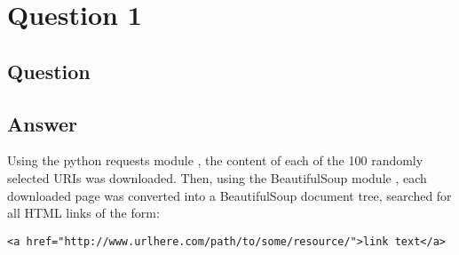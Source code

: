 \section{Question 1}

\subsection{Question}


\subsection{Answer}
Using the python requests module \cite{py:requests}, the content of each of the 100 randomly selected URIs was downloaded. Then, using the BeautifulSoup module \cite{py:soup}, each downloaded page was converted into a BeautifulSoup document tree, searched for all HTML links of the form:

\begin{verbatim}
<a href="http://www.urlhere.com/path/to/some/resource/">link text</a>
\end{verbatim}

